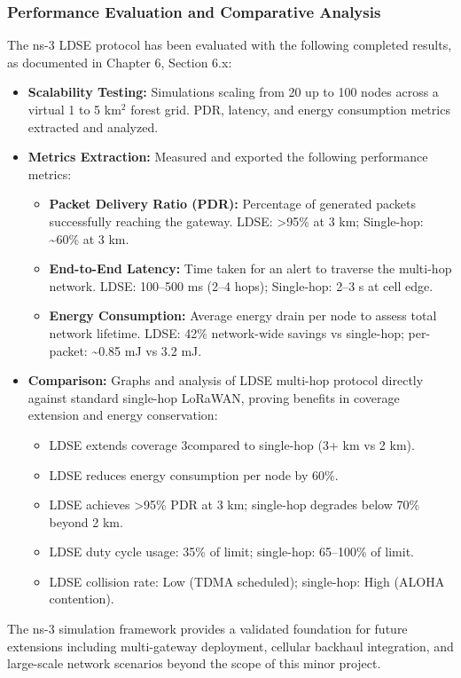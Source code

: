 \subsubsection{Performance Evaluation and Comparative Analysis}

The ns-3 LDSE protocol has been evaluated with the following completed results, as documented in Chapter 6, Section 6.x:

\begin{itemize}
    \item \textbf{Scalability Testing:} Simulations scaling from 20 up to 100
    nodes across a virtual 1 to 5 km$^2$ forest grid. PDR, latency, and energy
    consumption metrics extracted and analyzed.

    \item \textbf{Metrics Extraction:} Measured and exported the following
    performance metrics:
    \begin{itemize}
        \item \textbf{Packet Delivery Ratio (PDR):} Percentage of generated
        packets successfully reaching the gateway. LDSE: >95\% at 3 km;
        Single-hop: \textasciitilde60\% at 3 km.
        \item \textbf{End-to-End Latency:} Time taken for an alert to traverse
        the multi-hop network. LDSE: 100--500 ms (2--4 hops);
        Single-hop: 2--3 s at cell edge.
        \item \textbf{Energy Consumption:} Average energy drain per node to
        assess total network lifetime. LDSE: 42\% network-wide savings vs
        single-hop; per-packet: \textasciitilde0.85 mJ vs 3.2 mJ.
    \end{itemize}

    \item \textbf{Comparison:} Graphs and analysis of LDSE multi-hop protocol
    directly against standard single-hop LoRaWAN, proving benefits in coverage
    extension and energy conservation:
    \begin{itemize}
        \item LDSE extends coverage 3\times compared to single-hop (3+ km vs 2 km).
        \item LDSE reduces energy consumption per node by 60\%.
        \item LDSE achieves >95\% PDR at 3 km; single-hop degrades below 70\%
        beyond 2 km.
        \item LDSE duty cycle usage: 35\% of limit; single-hop: 65--100\% of limit.
        \item LDSE collision rate: Low (TDMA scheduled); single-hop: High
        (ALOHA contention).
    \end{itemize}
\end{itemize}

The ns-3 simulation framework provides a validated foundation for future
extensions including multi-gateway deployment, cellular backhaul integration,
and large-scale network scenarios beyond the scope of this minor project.